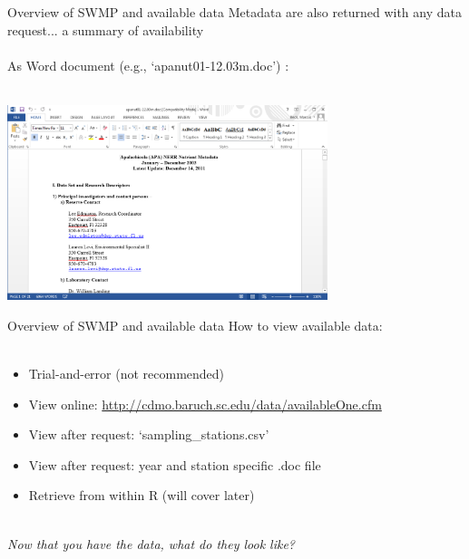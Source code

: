 \documentclass[xcolor=svgnames]{beamer}\usepackage[]{graphicx}\usepackage[]{color}
\begin{document}
\begin{frame}[t]{Overview of SWMP and available data}
Metadata are also returned with any data request... a summary of availability\\~\\
As Word document (e.g., `apanut01-12.03m.doc') :\\~\\
\centerline{\includegraphics[width = 0.7\textwidth]{meta_doc.png}}
\end{frame}

\begin{frame}{Overview of SWMP and available data}
\onslide<+->
How to view available data:\\~\\
\begin{itemize}
\item Trial-and-error (not recommended)
\item View online: \href{http://cdmo.baruch.sc.edu/data/availableOne.cfm}{http://cdmo.baruch.sc.edu/data/availableOne.cfm}
\item View after request: `sampling_stations.csv'
\item View after request: year and station specific .doc file
\item Retrieve from within R (will cover later) \\~\\
\end{itemize}
\onslide<+->
\centerline{\emph{Now that you have the data, what do they look like?}} 
\end{frame}
\end{document}
